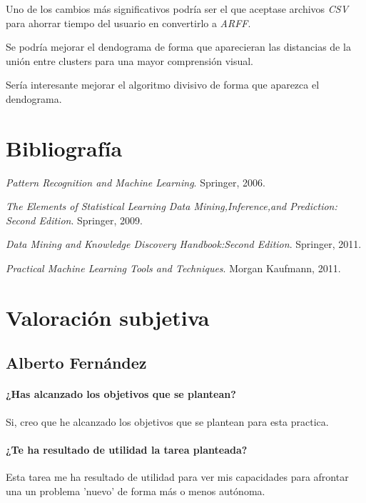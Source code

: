 \documentclass[11pt, titlepage,a4paper]{article}
\begin{document}
Uno de los cambios más significativos podría ser el que aceptase archivos
\textit{CSV} para ahorrar tiempo del usuario en convertirlo a \textit{ARFF}.
 
Se podría mejorar el dendograma de forma que aparecieran las distancias de la
unión entre clusters para una mayor comprensión visual. 

Sería interesante mejorar el algoritmo divisivo de forma que aparezca el
dendograma.

\section{Bibliografía}
\renewcommand{\refname}{\ }

\begin{thebibliography}{1}
	
	{\em Pattern Recognition and Machine Learning}.
	\newblock Springer, 2006.
	
	{\em The Elements of Statistical Learning Data Mining,Inference,and Prediction:
		Second Edition}.
	\newblock Springer, 2009.
	
	{\em Data Mining and Knowledge Discovery Handbook:Second Edition}.
	\newblock Springer, 2011.
	
	{\em Practical Machine Learning Tools and Techniques}.
	\newblock Morgan Kaufmann, 2011.
	
\end{thebibliography}

\section{Valoración subjetiva}

\subsection{Alberto Fernández}
\paragraph{¿Has alcanzado los objetivos que se plantean?\\}
Si, creo que he alcanzado los objetivos que se plantean para esta practica.

\paragraph{¿Te ha resultado de utilidad la tarea planteada?\\}
Esta tarea me ha resultado de utilidad para ver mis capacidades para afrontar
una un problema 'nuevo' de forma más o menos autónoma.
\end{document}
